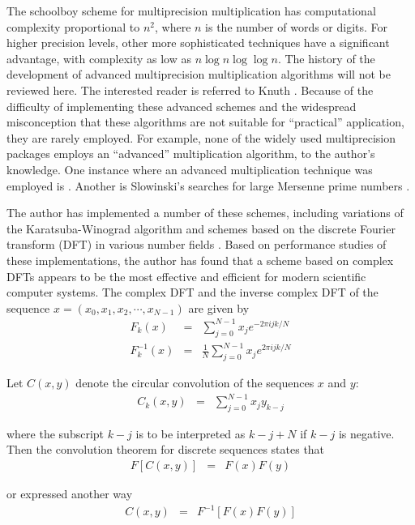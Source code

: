 The schoolboy scheme for multiprecision multiplication has
computational complexity proportional to $n^2$, where $n$ is the
number of words or digits.  For higher precision levels, other more
sophisticated techniques have a significant advantage, with complexity
as low as $n \log n \log \log n$.  The history of the development of
advanced multiprecision multiplication algorithms will not be reviewed
here.  The interested reader is referred to Knuth \cite{knuth}.
Because of the difficulty of implementing these advanced schemes and
the widespread misconception that these algorithms are not suitable
for ``practical'' application, they are rarely employed.  For example,
none of the widely used multiprecision packages employs an
``advanced'' multiplication algorithm, to the author's knowledge.  One
instance where an advanced multiplication technique was employed is
\cite{comba}.  Another is Slowinski's searches for large Mersenne prime
numbers \cite{slow}.

The author has implemented a number of these schemes, including
variations of the Karatsuba-Winograd algorithm and schemes based on
the discrete Fourier transform (DFT) in various number fields
\cite{knuth}.  Based on performance studies of these implementations,
the author has found that a scheme based on complex DFTs appears to be
the most effective and efficient for modern scientific computer
systems.  The complex DFT and the inverse complex DFT of the sequence
$x = (x_0, x_1, x_2, \cdots, x_{N-1})$ are given by
\begin{eqnarray*} 
F_k (x) &=& \sum_{j=0}^{N-1} x_j e^{-2 \pi i j k / N} \\ 
F_k^{-1} (x) &=& \frac{1}{N} \sum_{j=0}^{N-1} x_j e^{2 \pi i j k / N}
\end{eqnarray*}

\noindent
Let $C(x,y)$ denote the circular convolution of the sequences $x$ and
$y$:
\begin{eqnarray*}
C_k (x,y) &=& \sum_{j=0}^{N-1} x_j y_{k-j}
\end{eqnarray*}

\noindent
where the subscript $k - j$ is to be interpreted as $k - j + N$ if $k
- j$ is negative.  Then the convolution theorem for discrete sequences
states that
\begin{eqnarray*}
F[C(x,y)] &=& F(x) F(y)
\end{eqnarray*}

\noindent
or expressed another way
\begin{eqnarray*}
C(x,y) &=& F^{-1}[F(x) F(y)]
\end{eqnarray*}

